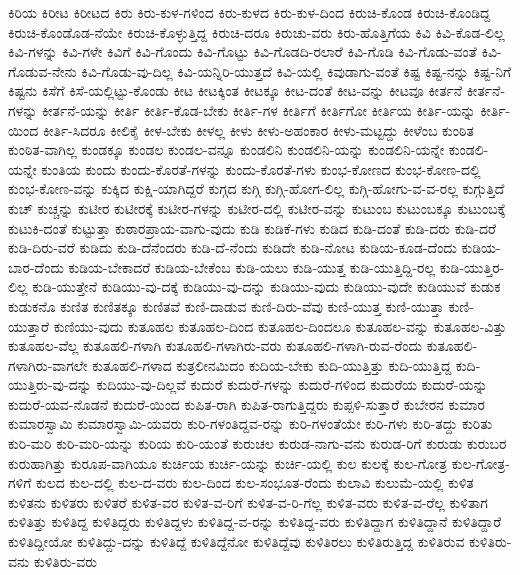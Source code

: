 {ಕಿರಿಯ
ಕಿರೀಟ
ಕಿರೀಟದ
ಕಿರು
ಕಿರು-ಕುಳ-ಗಳಿಂದ
ಕಿರು-ಕುಳದ
ಕಿರು-ಕುಳ-ದಿಂದ
ಕಿರುಚಿ-ಕೊಂಡ
ಕಿರುಚಿ-ಕೊಂಡಿದ್ದ
ಕಿರುಚಿ-ಕೊಂಡೊಡ-ನೆಯೇ
ಕಿರುಚಿ-ಕೊಳ್ಳುತ್ತಿದ್ದ
ಕಿರುಚಿ-ದರೂ
ಕಿರುಚು-ವರು
ಕಿರು-ಹೊತ್ತಿಗೆಯ
ಕಿವಿ
ಕಿವಿ-ಕೊಡ-ಲಿಲ್ಲ
ಕಿವಿ-ಗಳನ್ನು
ಕಿವಿ-ಗಳೇ
ಕಿವಿಗೆ
ಕಿವಿ-ಗೊಂದು
ಕಿವಿ-ಗೊಟ್ಟು
ಕಿವಿ-ಗೊಡದಿ-ರಲಾರೆ
ಕಿವಿ-ಗೊಡಿ
ಕಿವಿ-ಗೊಡು-ವಂತೆ
ಕಿವಿ-ಗೊಡುವ-ನೇನು
ಕಿವಿ-ಗೊಡು-ವು-ದಿಲ್ಲ
ಕಿವಿ-ಯನ್ನಿರಿ-ಯುತ್ತದೆ
ಕಿವಿ-ಯಲ್ಲಿ
ಕಿವುಡಾಗು-ವಂತೆ
ಕಿಷ್ಟ
ಕಿಷ್ಟ-ನನ್ನು
ಕಿಷ್ಟ-ನಿಗೆ
ಕಿಷ್ಟನು
ಕಿಸೆಗೆ
ಕಿಸೆ-ಯಲ್ಲಿಟ್ಟು-ಕೊಂಡು
ಕೀಟ
ಕೀಟಕ್ಕಿಂತ
ಕೀಟಕ್ಕೂ
ಕೀಟ-ದಂತೆ
ಕೀಟ-ವನ್ನು
ಕೀಟವೂ
ಕೀರ್ತನೆ
ಕೀರ್ತನೆ-ಗಳನ್ನು
ಕೀರ್ತನೆ-ಯನ್ನು
ಕೀರ್ತಿ
ಕೀರ್ತಿ-ಕೊಡ-ಬೇಕು
ಕೀರ್ತಿ-ಗಳ
ಕೀರ್ತಿಗೆ
ಕೀರ್ತಿಗೋ
ಕೀರ್ತಿಯ
ಕೀರ್ತಿ-ಯನ್ನು
ಕೀರ್ತಿ-ಯಿಂದ
ಕೀರ್ತಿ-ಸಿದರೂ
ಕೀಲಿಕೈ
ಕೀಳ-ಬೇಕು
ಕೀಳಲ್ಲ
ಕೀಳು
ಕೀಳು-ಅಹಂಕಾರ
ಕೀಳು-ಮಟ್ಟದ್ದು
ಕೀಳೆಂಬ
ಕುಂಠಿತ
ಕುಂಠಿತ-ವಾಗಿಲ್ಲ
ಕುಂಡಕ್ಕೂ
ಕುಂಡಲ
ಕುಂಡಲ-ವನ್ನೂ
ಕುಂಡಲಿನಿ
ಕುಂಡಲಿನಿ-ಯನ್ನು
ಕುಂಡಲಿನಿ-ಯನ್ನೇ
ಕುಂಡಲಿ-ಯನ್ನೇ
ಕುಂತಿಯ
ಕುಂದು
ಕುಂದು-ಕೊರತೆ-ಗಳನ್ನು
ಕುಂದು-ಕೊರತೆ-ಗಳು
ಕುಂಭ-ಕೋಣದ
ಕುಂಭ-ಕೋಣ-ದಲ್ಲಿ
ಕುಂಭ-ಕೋಣ-ವನ್ನು
ಕುಕ್ಕಿದ
ಕುಕ್ಷಿ-ಯಾಗಿದ್ದರೆ
ಕುಗ್ಗದ
ಕುಗ್ಗಿ
ಕುಗ್ಗಿ-ಹೋಗ-ಲಿಲ್ಲ
ಕುಗ್ಗಿ-ಹೋಗು-ವ-ವ-ರಲ್ಲ
ಕುಗ್ಗುತ್ತಿದೆ
ಕುಚ್
ಕುಚ್ಚನ್ನು
ಕುಟೀರ
ಕುಟೀರಕ್ಕೆ
ಕುಟೀರ-ಗಳನ್ನು
ಕುಟೀರ-ದಲ್ಲಿ
ಕುಟೀರ-ವನ್ನು
ಕುಟುಂಬ
ಕುಟುಂಬಕ್ಕೂ
ಕುಟುಂಬಕ್ಕೆ
ಕುಟುಕಿ-ದಂತೆ
ಕುಟ್ಟುತ್ತಾ
ಕುಠಾರಪ್ರಾಯ-ವಾಗು-ವುದು
ಕುಡಿ
ಕುಡಿಕೆ-ಗಳು
ಕುಡಿದ
ಕುಡಿ-ದಂತೆ
ಕುಡಿ-ದರು
ಕುಡಿ-ದರೆ
ಕುಡಿ-ದಿರು-ವರೆ
ಕುಡಿದು
ಕುಡಿ-ದೆನೆಂದರು
ಕುಡಿ-ದೆ-ನೆಂದು
ಕುಡಿದೇ
ಕುಡಿ-ನೋಟ
ಕುಡಿಯ-ಕೂಡ-ದೆಂದು
ಕುಡಿಯ-ಬಾರ-ದೆಂದು
ಕುಡಿಯ-ಬೇಕಾದರೆ
ಕುಡಿಯ-ಬೇಕೆಂಬ
ಕುಡಿ-ಯಲು
ಕುಡಿ-ಯುತ್ತ
ಕುಡಿ-ಯುತ್ತಿದ್ದಿ-ರಲ್ಲ
ಕುಡಿ-ಯುತ್ತಿರ-ಲಿಲ್ಲ
ಕುಡಿ-ಯುತ್ತೇನೆ
ಕುಡಿಯು-ವು-ದಕ್ಕೆ
ಕುಡಿಯು-ವು-ದನ್ನು
ಕುಡಿಯು-ವುದು
ಕುಡಿಯು-ವುದೇ
ಕುಡಿಯುವೆ
ಕುಡುಕ
ಕುಡುಕನೊ
ಕುಣಿತ
ಕುಣಿತಕ್ಕೂ
ಕುಣಿತವೆ
ಕುಣಿ-ದಾಡುವ
ಕುಣಿ-ದಿರು-ವೆವು
ಕುಣಿ-ಯುತ್ತ
ಕುಣಿ-ಯುತ್ತಾ
ಕುಣಿ-ಯುತ್ತಾರೆ
ಕುಣಿಯು-ವುದು
ಕುತೂಹಲ
ಕುತೂಹಲ-ದಿಂದ
ಕುತೂಹಲ-ದಿಂದಲೂ
ಕುತೂಹಲ-ವನ್ನು
ಕುತೂಹಲ-ವಿತ್ತು
ಕುತೂಹಲ-ವೆಲ್ಲ
ಕುತೂಹಲಿ-ಗಳಾಗಿ
ಕುತೂಹಲಿ-ಗಳಾಗಿರು-ವರು
ಕುತೂಹಲಿ-ಗಳಾಗಿ-ರುವ-ರೆಂದು
ಕುತೂಹಲಿ-ಗಳಾಗಿರು-ವಾಗಲೇ
ಕುತೂಹಲಿ-ಗಳಾದ
ಕುತ್ರಲೀನಮಿದಂ
ಕುದಿಯ-ಬೇಕು
ಕುದಿ-ಯುತ್ತಿತ್ತು
ಕುದಿ-ಯುತ್ತಿದ್ದ
ಕುದಿ-ಯುತ್ತಿರು-ವು-ದನ್ನು
ಕುದಿಯು-ವು-ದಿಲ್ಲವೆ
ಕುದುರೆ
ಕುದುರೆ-ಗಳನ್ನು
ಕುದುರೆ-ಗಳಿಂದ
ಕುದುರೆಯ
ಕುದುರೆ-ಯನ್ನು
ಕುದುರೆ-ಯವ-ನೊಡನೆ
ಕುದುರೆ-ಯಿಂದ
ಕುಪಿತ-ರಾಗಿ
ಕುಪಿತ-ರಾಗುತ್ತಿದ್ದರು
ಕುಪ್ಪಳಿ-ಸುತ್ತಾರೆ
ಕುಬೇರನ
ಕುಮಾರ
ಕುಮಾರಸ್ವಾಮಿ
ಕುಮಾರಸ್ವಾಮಿ-ಯವರು
ಕುರಿ-ಗಳಂತಿದ್ದವ-ರನ್ನು
ಕುರಿ-ಗಳಂತೆಯೇ
ಕುರಿ-ಗಳು
ಕುರಿ-ತದ್ದು
ಕುರಿತು
ಕುರಿ-ಮರಿ
ಕುರಿ-ಮರಿ-ಯನ್ನು
ಕುರಿಯ
ಕುರಿ-ಯಂತೆ
ಕುರುಚಲ
ಕುರುಡ-ನಾಗು-ವನು
ಕುರುಡ-ರಿಗೆ
ಕುರುಡು
ಕುರುಬರ
ಕುರುಹಾಗಿತ್ತು
ಕುರೂಪ-ವಾಗಿಯೂ
ಕುರ್ಚಿಯ
ಕುರ್ಚಿ-ಯನ್ನು
ಕುರ್ಚಿ-ಯಲ್ಲಿ
ಕುಲ
ಕುಲಕ್ಕೆ
ಕುಲ-ಗೋತ್ರ
ಕುಲ-ಗೋತ್ರ-ಗಳಿಗೆ
ಕುಲದ
ಕುಲ-ದಲ್ಲಿ
ಕುಲ-ದ-ವರು
ಕುಲ-ದಿಂದ
ಕುಲ-ಸಂಭೂತ-ರೆಂದು
ಕುಲಾವಿ
ಕುಲುಮೆ-ಯಲ್ಲಿ
ಕುಳಿತ
ಕುಳಿತನು
ಕುಳಿತರು
ಕುಳಿತರೆ
ಕುಳಿತ-ವರ
ಕುಳಿತ-ವ-ರಿಗೆ
ಕುಳಿತ-ವ-ರಿ-ಗೆಲ್ಲ
ಕುಳಿತ-ವರು
ಕುಳಿತ-ವ-ರೆಲ್ಲ
ಕುಳಿತಾಗ
ಕುಳಿತಿತ್ತು
ಕುಳಿತಿದ್ದ
ಕುಳಿತಿದ್ದರು
ಕುಳಿತಿದ್ದಳು
ಕುಳಿತಿದ್ದ-ವ-ರನ್ನು
ಕುಳಿತಿದ್ದ-ವರು
ಕುಳಿತಿದ್ದಾಗ
ಕುಳಿತಿದ್ದಾನೆ
ಕುಳಿತಿದ್ದಾರೆ
ಕುಳಿತಿದ್ದೀಯೋ
ಕುಳಿತಿದ್ದು-ದನ್ನು
ಕುಳಿತಿದ್ದೆ
ಕುಳಿತಿದ್ದೆನೋ
ಕುಳಿತಿದ್ದೆವು
ಕುಳಿತಿರಲು
ಕುಳಿತಿರುತ್ತಿದ್ದ
ಕುಳಿತಿರುವ
ಕುಳಿತಿರು-ವನು
ಕುಳಿತಿರು-ವರು
}
